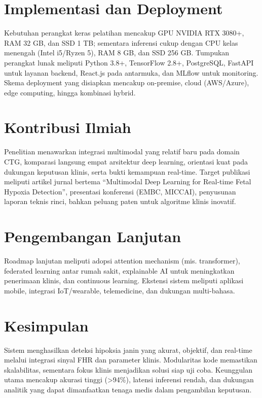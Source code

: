 \documentclass[11pt,a4paper]{article}
\begin{document}
\section{Implementasi dan Deployment}
Kebutuhan perangkat keras pelatihan mencakup GPU NVIDIA RTX 3080+, RAM 32 GB, dan SSD 1 TB; sementara inferensi cukup dengan CPU kelas menengah (Intel i5/Ryzen 5), RAM 8 GB, dan SSD 256 GB. Tumpukan perangkat lunak meliputi Python 3.8+, TensorFlow 2.8+, PostgreSQL, FastAPI untuk layanan backend, React.js pada antarmuka, dan MLflow untuk monitoring. Skema deployment yang disiapkan mencakup on-premise, cloud (AWS/Azure), edge computing, hingga kombinasi hybrid.

\section{Kontribusi Ilmiah}
Penelitian menawarkan integrasi multimodal yang relatif baru pada domain CTG, komparasi langsung empat arsitektur deep learning, orientasi kuat pada dukungan keputusan klinis, serta bukti kemampuan real-time. Target publikasi meliputi artikel jurnal bertema ``Multimodal Deep Learning for Real-time Fetal Hypoxia Detection'', presentasi konferensi (EMBC, MICCAI), penyusunan laporan teknis rinci, bahkan peluang paten untuk algoritme klinis inovatif.

\section{Pengembangan Lanjutan}
Roadmap lanjutan meliputi adopsi attention mechanism (mis. transformer), federated learning antar rumah sakit, explainable AI untuk meningkatkan penerimaan klinis, dan continuous learning. Ekstensi sistem meliputi aplikasi mobile, integrasi IoT/wearable, telemedicine, dan dukungan multi-bahasa.

\section{Kesimpulan}
Sistem menghasilkan deteksi hipoksia janin yang akurat, objektif, dan real-time melalui integrasi sinyal FHR dan parameter klinis. Modularitas kode memastikan skalabilitas, sementara fokus klinis menjadikan solusi siap uji coba. Keunggulan utama mencakup akurasi tinggi (\textgreater{}94\%), latensi inferensi rendah, dan dukungan analitik yang dapat dimanfaatkan tenaga medis dalam pengambilan keputusan.
\end{document}

